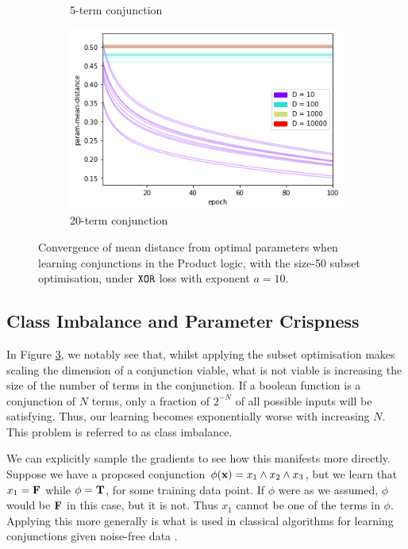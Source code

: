 \begin{figure}[h]
\begin{subfigure}[b]{0.30\textwidth}
        \caption{5-term conjunction}
        \label{fig:conjconvkeepn5}
    \end{subfigure}
    \begin{subfigure}[b]{0.30\textwidth}
        \centering
        \includegraphics[width=\textwidth]{imgs/conj-pmd-prod-keep50-20t.png}
        \caption{20-term conjunction}
        \label{fig:conjconvkeepn20}
    \end{subfigure}
       \caption{Convergence of mean distance from optimal parameters when learning conjunctions in the Product logic, with the size-50 subset optimisation, under $\texttt{XOR}$ loss with exponent $a=10$.}
       \label{fig:conjconvkeepn}
\end{figure}

\subsection{Class Imbalance and Parameter Crispness}

In Figure \ref{fig:conjconvkeepn}, we notably see that, whilst applying the subset optimisation makes scaling the dimension of a conjunction viable, what is not viable is increasing the size of the number of terms in the conjunction. If a boolean function is a conjunction of $N$ terms, only a fraction of $2^{-N}$ of all possible inputs will be satisfying. Thus, our learning becomes exponentially worse with increasing $N$. This problem is referred to as class imbalance.

We can explicitly sample the gradients to see how this manifests more directly. Suppose we have a proposed conjunction $\phi(\mathbf{x}) = x_1 \land x_2 \land x_3$, but we learn that $x_1 = \textbf{F}$ while $\phi = \textbf{T}$, for some training data point. If $\phi$ were as we assumed, $\phi$ would be $\textbf{F}$ in this case, but it is not. Thus $x_1$ cannot be one of the terms in $\phi$. Applying this more generally is what is used in classical algorithms for learning conjunctions given noise-free data \cite{clt}.

